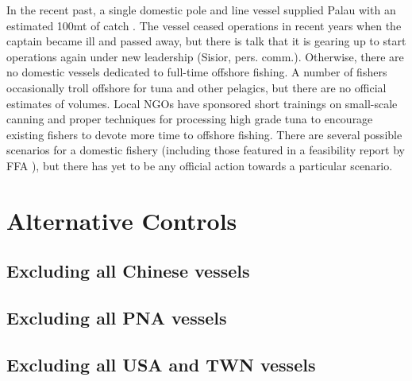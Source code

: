 \documentclass[9pt,twoside,lineno]{pnas-new}
\begin{document}
In the recent past, a single domestic pole and line vessel supplied Palau with an estimated 100mt of catch \cite{Gillett2016}. The vessel ceased operations in recent years when the captain became ill and passed away, but there is talk that it is gearing up to start operations again under new leadership (Sisior, pers. comm.). Otherwise, there are no domestic vessels dedicated to full-time offshore fishing. A number of fishers occasionally troll offshore for tuna and other pelagics, but there are no official estimates of volumes. 
Local NGOs have sponsored short trainings on small-scale canning and proper techniques for processing high grade tuna to encourage existing fishers to devote more time to offshore fishing. There are several possible scenarios for a domestic fishery (including those featured in a feasibility report by FFA \citep{Skirtun2017}), but there has yet to be any official action towards a particular scenario. 

\clearpage

\section{Alternative Controls}
\subsection{Excluding all Chinese vessels}



\clearpage
\subsection{Excluding all PNA vessels}



\clearpage
\subsection{Excluding all USA and TWN vessels}


\end{document}
